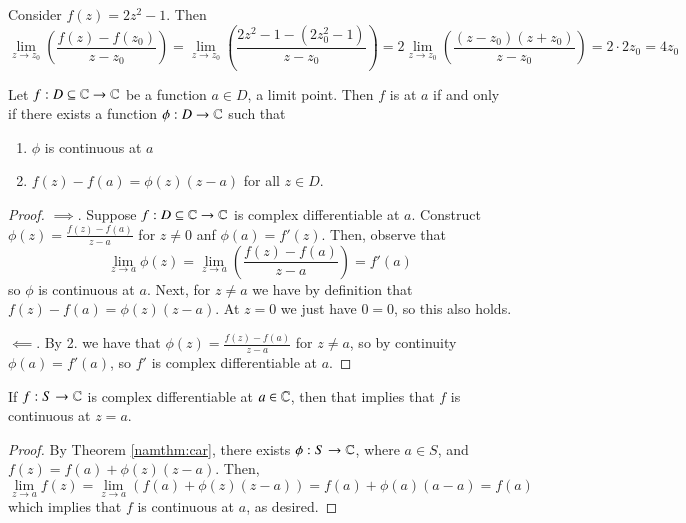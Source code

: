 \begin{example}
    Consider $f(z) = 2z^2 - 1$. Then \begin{equation*}
        \lim\limits_{z\rightarrow z_0}\left(\frac{f(z) - f(z_0)}{z-z_0}\right) = \lim\limits_{z\rightarrow z_0}\left(\frac{2z^2 - 1 - (2z_0^2 - 1)}{z-z_0}\right) = 2\lim\limits_{z\rightarrow z_0}\left(\frac{(z-z_0)(z+z_0)}{z-z_0}\right) = 2\cdot 2z_0 = 4z_0
    \end{equation*}
\end{example}

\begin{theorem}\label{namthm:car}
    Let $f:D\subseteq \mathbb C\rightarrow \mathbb C$ be a function $a \in D$, a limit point. Then $f$ is  at $a$ if and only if there exists a function $\phi:D\rightarrow \mathbb C$ such that \begin{enumerate}
        \item $\phi$ is continuous at $a$
        \item $f(z)-f(a) = \phi(z)(z-a)$ for all $z \in D$.
    \end{enumerate}
\end{theorem}
\begin{proof}
    $\implies.$ Suppose $f:D\subseteq \mathbb C\rightarrow \mathbb C$ is complex differentiable at $a$. Construct $\phi(z) = \frac{f(z) - f(a)}{z-a}$ for $z \neq 0$ anf $\phi(a) = f'(z)$. Then, observe that \begin{equation*}
        \lim\limits_{z\rightarrow a}\phi(z) = \lim\limits_{z\rightarrow a}\left(\frac{f(z)-f(a)}{z-a}\right) = f'(a)
    \end{equation*}
    so $\phi$ is continuous at $a$. Next, for $z \neq a$ we have by definition that $f(z) - f(a) = \phi(z)(z-a)$. At $z = 0$ we just have $0 = 0$, so this also holds. 
    
    $\impliedby.$ By 2. we have that $\phi(z) = \frac{f(z) - f(a)}{z-a}$ for $z \neq a$, so by continuity $\phi(a) = f'(a)$, so $f'$ is complex differentiable at $a$.
\end{proof}

\begin{theorem}
    If $f:S\rightarrow \mathbb C$ is complex differentiable at $a \in \mathbb C$, then that implies that $f$ is continuous at $z = a$. 
\end{theorem}
\begin{proof}
    By Theorem \ref{namthm:car}, there exists $\phi:S\rightarrow \mathbb C$, where $a \in S$, and $f(z) = f(a)+\phi(z)(z-a)$. Then, \begin{equation*}
        \lim\limits_{z\rightarrow a}f(z) = \lim\limits_{z\rightarrow a}(f(a)+\phi(z)(z-a)) = f(a) + \phi(a)(a-a) = f(a)
    \end{equation*}
    which implies that $f$ is continuous at $a$, as desired.
\end{proof}

